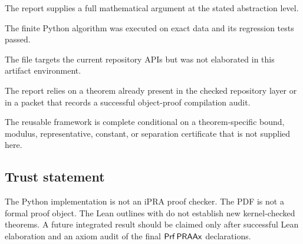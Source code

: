 \begin{description}[leftmargin=3.2cm,style=nextline]
\item[Human theorem complete.]
The report supplies a full mathematical argument at the stated abstraction
level.

\item[Reference tested.]
The finite Python algorithm was executed on exact data and its regression tests
passed.

\item[Lean source-oriented.]
The file targets the current repository APIs but was not elaborated in this
artifact environment.

\item[Kernel checked upstream.]
The report relies on a theorem already present in the checked repository layer
or in a packet that records a successful object-proof compilation audit.

\item[Open producer.]
The reusable framework is complete conditional on a theorem-specific bound,
modulus, representative, constant, or separation certificate that is not
supplied here.
\end{description}

\subsection{Trust statement}

The Python implementation is not an iPRA proof checker.  The PDF is not a
formal proof object.  The Lean outlines with  do not establish new
kernel-checked theorems.  A future integrated result should be claimed only
after successful Lean elaboration and an axiom audit of the final
\(\mathsf{Prf}\,\mathsf{PRAAx}\) declarations.
